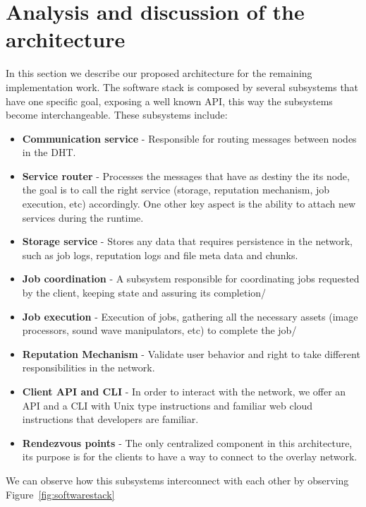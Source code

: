 
% 
% 

\section{Analysis and discussion of the architecture}

In this section we describe our proposed architecture for the remaining implementation work. The software stack is composed by several subsystems that have one specific goal, exposing a well known API, this way the subsystems become interchangeable. These subsystems include:

\begin{itemize}
  \item \textbf{Communication service} - Responsible for routing messages between nodes in the DHT.
  \item \textbf{Service router} - Processes the messages that have as destiny the its node, the goal is to call the right service (storage, reputation mechanism, job execution, etc) accordingly. One other key aspect is the ability to attach new services during the runtime.
  \item \textbf{Storage service} - Stores any data that requires persistence in the network, such as job logs, reputation logs and file meta data and chunks.
  \item \textbf{Job coordination} - A subsystem responsible for coordinating jobs requested by the client, keeping state and assuring its completion/
  \item \textbf{Job execution} - Execution of jobs, gathering all the necessary assets (image processors, sound wave manipulators, etc) to complete the job/
  \item \textbf{Reputation Mechanism} - Validate user behavior and right to take different responsibilities in the network.
  \item \textbf{Client API and CLI} - In order to interact with the network, we offer an API and a CLI with Unix type instructions and familiar web cloud instructions that developers are familiar.
  \item \textbf{Rendezvous points} - The only centralized component in this architecture, its purpose is for the clients to have a way to connect to the overlay network. 
\end{itemize}

We can observe how this subsystems interconnect with each other by observing Figure~\ref{fig:softwarestack}

